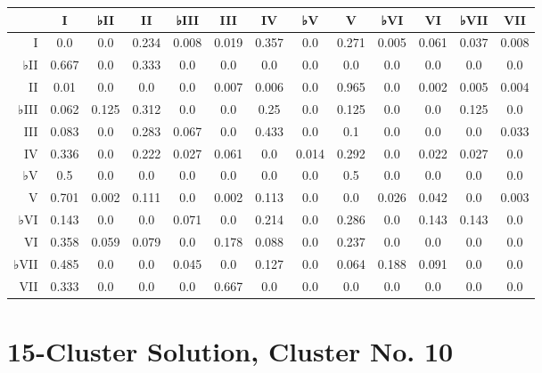 \begin{table}[htbp]
\begin{minipage}{\linewidth}
\setlength{\tymax}{0.5\linewidth}
\centering
\small
\begin{tabulary}{\textwidth}{@{}RCCCCCCCCCCCC@{}} \toprule
&I&♭II&II&♭III&III&IV&♭V&V&♭VI&VI&♭VII&VII\\
\midrule
I&0.0&0.0&0.234&0.008&0.019&0.357&0.0&0.271&0.005&0.061&0.037&0.008\\
♭II&0.667&0.0&0.333&0.0&0.0&0.0&0.0&0.0&0.0&0.0&0.0&0.0\\
II&0.01&0.0&0.0&0.0&0.007&0.006&0.0&0.965&0.0&0.002&0.005&0.004\\
♭III&0.062&0.125&0.312&0.0&0.0&0.25&0.0&0.125&0.0&0.0&0.125&0.0\\
III&0.083&0.0&0.283&0.067&0.0&0.433&0.0&0.1&0.0&0.0&0.0&0.033\\
IV&0.336&0.0&0.222&0.027&0.061&0.0&0.014&0.292&0.0&0.022&0.027&0.0\\
♭V&0.5&0.0&0.0&0.0&0.0&0.0&0.0&0.5&0.0&0.0&0.0&0.0\\
V&0.701&0.002&0.111&0.0&0.002&0.113&0.0&0.0&0.026&0.042&0.0&0.003\\
♭VI&0.143&0.0&0.0&0.071&0.0&0.214&0.0&0.286&0.0&0.143&0.143&0.0\\
VI&0.358&0.059&0.079&0.0&0.178&0.088&0.0&0.237&0.0&0.0&0.0&0.0\\
♭VII&0.485&0.0&0.0&0.045&0.0&0.127&0.0&0.064&0.188&0.091&0.0&0.0\\
VII&0.333&0.0&0.0&0.0&0.667&0.0&0.0&0.0&0.0&0.0&0.0&0.0\\

\bottomrule

\end{tabulary}
\end{minipage}
\end{table}

\section{15-Cluster Solution, Cluster No. 10}
\label{15-clustersolutionclusterno.10}

